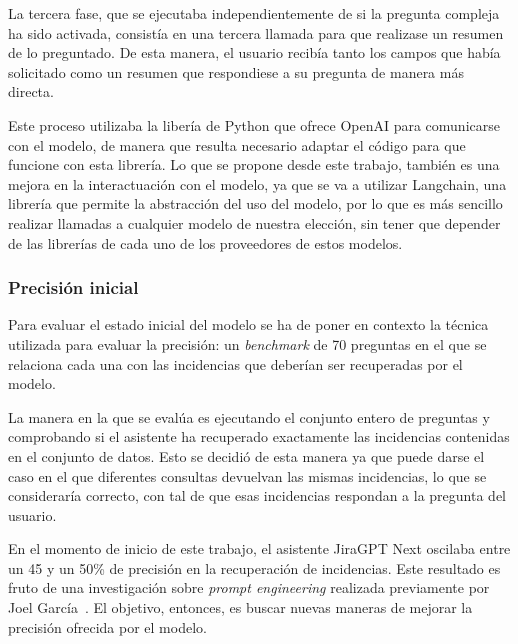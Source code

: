 La tercera fase, que se ejecutaba independientemente de si la pregunta compleja ha sido activada, consistía en una tercera llamada para que realizase un resumen de lo preguntado. De esta manera, el usuario recibía tanto los campos que había solicitado como un resumen que respondiese a su pregunta de manera más directa.

Este proceso utilizaba la libería de Python que ofrece OpenAI para comunicarse con el modelo, de manera que resulta necesario adaptar el código para que funcione con esta librería. Lo que se propone desde este trabajo, también es una mejora en la interactuación con el modelo, ya que se va a utilizar Langchain, una librería que permite la abstracción del uso del modelo, por lo que es más sencillo realizar llamadas a cualquier modelo de nuestra elección, sin tener que depender de las librerías de cada uno de los proveedores de estos modelos.

\subsubsection{Precisión inicial}
Para evaluar el estado inicial del modelo se ha de poner en contexto la técnica utilizada para evaluar la precisión: un \textit{benchmark} de 70 preguntas en el que se relaciona cada una con las incidencias que deberían ser recuperadas por el modelo.

La manera en la que se evalúa es ejecutando el conjunto entero de preguntas y comprobando si el asistente ha recuperado exactamente las incidencias contenidas en el conjunto de datos. Esto se decidió de esta manera ya que puede darse el caso en el que diferentes consultas devuelvan las mismas incidencias, lo que se consideraría correcto, con tal de que esas incidencias respondan a la pregunta del usuario.

En el momento de inicio de este trabajo, el asistente JiraGPT Next oscilaba entre un 45 y un 50\% de precisión en la recuperación de incidencias. Este resultado es fruto de una investigación sobre \textit{prompt engineering} realizada previamente por Joel García~\cite{jiragpt}. El objetivo, entonces, es buscar nuevas maneras de mejorar la precisión ofrecida por el modelo.